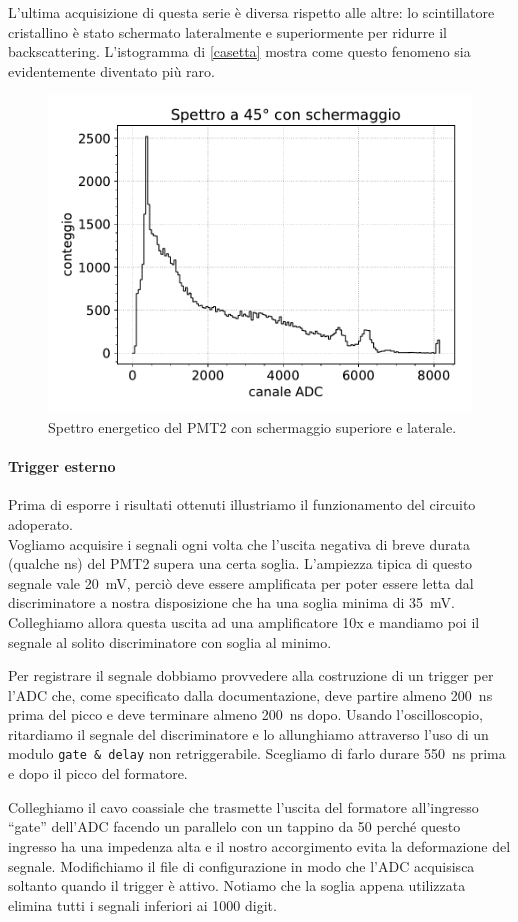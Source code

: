 L'ultima acquisizione di questa serie è diversa rispetto alle altre: lo scintillatore cristallino è stato schermato lateralmente e superiormente per ridurre il backscattering. L'istogramma di \autoref{casetta} mostra come questo fenomeno sia evidentemente diventato più raro.

\begin{figure}
\centering
\includegraphics[width=25 em]{45gs}
\caption{Spettro energetico del PMT2 con schermaggio superiore e laterale.}
\label{casetta}
\end{figure}

\paragraph{Trigger esterno} Prima di esporre i risultati ottenuti illustriamo il funzionamento del circuito adoperato.\\
Vogliamo acquisire i segnali ogni volta che l'uscita negativa di breve durata (qualche \si{ns}) del PMT2 supera una certa soglia. L'ampiezza tipica di questo segnale vale \SI{20}{mV}, perciò deve essere amplificata per poter essere letta dal discriminatore a nostra disposizione che ha una soglia minima di \SI{35}{mV}. Colleghiamo allora questa uscita ad una amplificatore 10x 
e mandiamo poi il segnale al solito discriminatore con soglia al minimo.

Per registrare il segnale dobbiamo provvedere alla costruzione di un trigger per l'ADC che, come specificato dalla documentazione, deve partire almeno \SI{200}{ns} prima del picco e deve terminare almeno \SI{200}{ns} dopo. Usando l'oscilloscopio, ritardiamo il segnale del discriminatore e lo allunghiamo attraverso l'uso di un modulo \texttt{gate \& delay} non retriggerabile. Scegliamo di farlo durare \SI{550}{ns} prima e dopo il picco del formatore.

Colleghiamo il cavo coassiale che trasmette l'uscita del formatore all'ingresso ``gate'' dell'ADC facendo un parallelo con un tappino da \SI{50}{\Omega} perché questo ingresso ha una impedenza alta e il nostro accorgimento evita la deformazione del segnale.
Modifichiamo il file di configurazione in modo che l'ADC acquisisca soltanto quando il trigger è attivo. Notiamo che la soglia appena utilizzata elimina tutti i segnali inferiori ai 1000 digit. 
